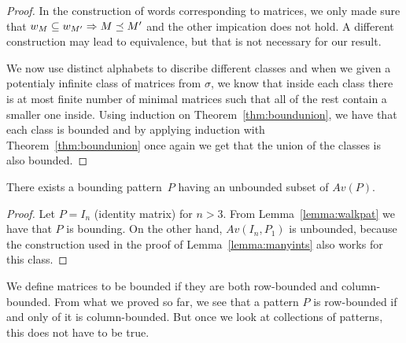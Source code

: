 \begin{proof}
In the construction of words corresponding to matrices, we only made sure that $w_M\subseteq w_{M'}\Rightarrow M\preceq M'$ and the other impication does not hold. A different construction may lead to equivalence, but that is not necessary for our result.

We now use distinct alphabets to discribe different classes and when we given a potentialy infinite class of matrices from $\sigma$, we know that inside each class there is at most finite number of minimal matrices such that all of the rest contain a smaller one inside. Using induction on Theorem~\ref{thm:boundunion}, we have that each class is bounded and by applying induction with Theorem~\ref{thm:boundunion} once again we get that the union of the classes is also bounded.
\end{proof}

\begin{obs}
There exists a bounding pattern~$P$ having an unbounded subset of $Av(P)$.
\end{obs}
\begin{proof}
Let $P=I_n$ (identity matrix) for $n>3$. From Lemma~\ref{lemma:walkpat} we have that $P$ is bounding. On the other hand, $Av(I_n,P_1)$ is unbounded, because the construction used in the proof of Lemma~\ref{lemma:manyints} also works for this class.
\end{proof}

We define matrices to be bounded if they are both row-bounded and column-bounded. From what we proved so far, we see that a pattern $P$ is row-bounded if and only of it is column-bounded. But once we look at collections of patterns, this does not have to be true.


